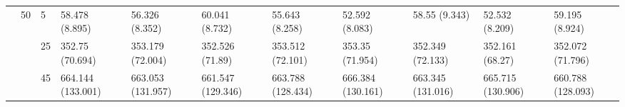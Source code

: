 \begin{tabular}{lllllllllll}
\cline{2-11}
 & \multirow[t]{3}{*}{50} & 5 & 58.478 (8.895) & 56.326 (8.352) & 60.041 (8.732) & 55.643 (8.258) & 52.592 (8.083) & 58.55 (9.343) & 52.532 (8.209) & 59.195 (8.924) \\
 &  & 25 & 352.75 (70.694) & 353.179 (72.004) & 352.526 (71.89) & 353.512 (72.101) & 353.35 (71.954) & 352.349 (72.133) & 352.161 (68.27) & 352.072 (71.796) \\
 &  & 45 & 664.144 (133.001) & 663.053 (131.957) & 661.547 (129.346) & 663.788 (128.434) & 666.384 (130.161) & 663.345 (131.016) & 665.715 (130.906) & 660.788 (128.093) \\
\cline{1-11} \cline{2-11}
\bottomrule
\end{tabular}
